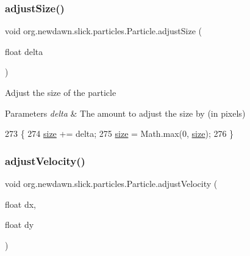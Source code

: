 \subsubsection{\texorpdfstring{adjust\+Size()}{adjustSize()}}
{\footnotesize\ttfamily void org.\+newdawn.\+slick.\+particles.\+Particle.\+adjust\+Size (\begin{DoxyParamCaption}\item[{float}]{delta }\end{DoxyParamCaption})\hspace{0.3cm}{\ttfamily [inline]}}

Adjust the size of the particle


\begin{DoxyParams}{Parameters}
{\em delta} & The amount to adjust the size by (in pixels) \\
\hline
\end{DoxyParams}

\begin{DoxyCode}
273                                         \{
274         \mbox{\hyperlink{classorg_1_1newdawn_1_1slick_1_1particles_1_1_particle_a93954bf2e145c626121ad55dd164b9fc}{size}} += delta;
275         \mbox{\hyperlink{classorg_1_1newdawn_1_1slick_1_1particles_1_1_particle_a93954bf2e145c626121ad55dd164b9fc}{size}} = Math.max(0, \mbox{\hyperlink{classorg_1_1newdawn_1_1slick_1_1particles_1_1_particle_a93954bf2e145c626121ad55dd164b9fc}{size}});
276     \}
\end{DoxyCode}
\mbox{\label{classorg_1_1newdawn_1_1slick_1_1particles_1_1_particle_a241c6e466f7c1aa7d9155d226840ca3d}} 
\subsubsection{\texorpdfstring{adjust\+Velocity()}{adjustVelocity()}}
{\footnotesize\ttfamily void org.\+newdawn.\+slick.\+particles.\+Particle.\+adjust\+Velocity (\begin{DoxyParamCaption}\item[{float}]{dx,  }\item[{float}]{dy }\end{DoxyParamCaption})\hspace{0.3cm}{\ttfamily [inline]}}

